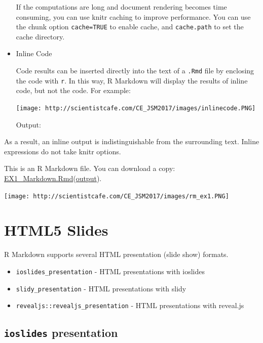 \documentclass[]{book}
\providecommand{\tightlist}{%
  \setlength{\itemsep}{0pt}\setlength{\parskip}{0pt}}
\theoremstyle{definition}
\theoremstyle{definition}
\theoremstyle{remark}
\begin{document}
\begin{itemize}
  If the computations are long and document rendering becomes time
  consuming, you can use knitr caching to improve performance. You can
  use the chunk option \texttt{cache=TRUE} to enable cache, and
  \texttt{cache.path} to set the cache directory.
\item
  Inline Code

  Code results can be inserted directly into the text of a \texttt{.Rmd}
  file by enclosing the code with \texttt{r}. In this way, R Markdown
  will display the results of inline code, but not the code. For
  example:

  \texttt{[image: http://scientistcafe.com/CE\_JSM2017/images/inlinecode.PNG]}

  Output:
\end{itemize}

As a result, an inline output is indistinguishable from the surrounding
text. Inline expressions do not take knitr options.

This is an R Markdown file. You can download a copy:
\href{https://raw.githubusercontent.com/happyrabbit/linhui.org/gh-pages/CE_JSM2017/Examples/EX1_Markdown.Rmd}{EX1\_Markdown.Rmd}(\href{http://scientistcafe.com/CE_JSM2017/Examples/EX1_Markdown.html}{output}).

\texttt{[image: http://scientistcafe.com/CE\_JSM2017/images/rm\_ex1.PNG]}

\section{HTML5 Slides}\label{html5-slides}

R Markdown supports several HTML presentation (slide show) formats.

\begin{itemize}
\tightlist
\item
  \texttt{ioslides\_presentation} - HTML presentations with ioslides
\item
  \texttt{slidy\_presentation} - HTML presentations with slidy
\item
  \texttt{revealjs::revealjs\_presentation} - HTML presentations with
  reveal.js
\end{itemize}

\subsection{\texorpdfstring{\texttt{ioslides}
presentation}{ioslides presentation}}\label{ioslides-presentation}
\end{document}
